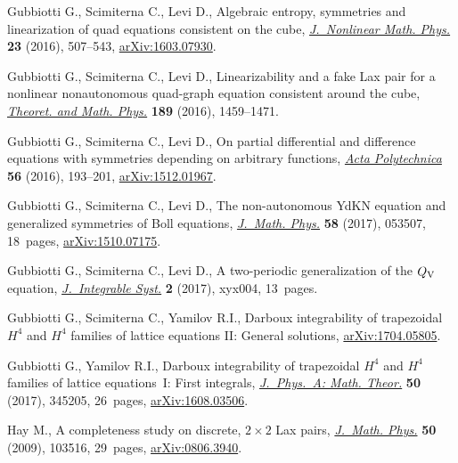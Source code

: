 \documentclass[pdftex]{sigma}
\numberwithin{equation}{section}
\begin{document}
\begin{thebibliography}{99}
Gubbiotti G., Scimiterna C., Levi D., Algebraic entropy, symmetries and
 linearization of quad equations consistent on the cube, \href{https://doi.org/10.1080/14029251.2016.1237200}{\textit{J.~Nonlinear
 Math. Phys.}} \textbf{23} (2016), 507--543, \href{https://arxiv.org/abs/1603.07930}{arXiv:1603.07930}.

Gubbiotti G., Scimiterna C., Levi D., Linearizability and a fake Lax pair for a
 nonlinear nonautonomous quad-graph equation consistent around the cube,
 \href{https://doi.org/10.1134/S0040577916100068}{\textit{Theoret. and Math. Phys.}} \textbf{189} (2016), 1459--1471.

Gubbiotti G., Scimiterna C., Levi D., On partial dif\/ferential and dif\/ference
 equations with symmetries depending on arbitrary functions, \href{https://doi.org/10.14311/AP.2016.56.0193}{\textit{Acta
 Polytechnica}} \textbf{56} (2016), 193--201, \href{https://arxiv.org/abs/1512.01967}{arXiv:1512.01967}.

Gubbiotti G., Scimiterna C., Levi D., The non-autonomous {Y}d{KN} equation and
 generalized symmetries of {B}oll equations, \href{https://doi.org/10.1063/1.4982747}{\textit{J.~Math. Phys.}}
 \textbf{58} (2017), 053507, 18~pages, \href{https://arxiv.org/abs/1510.07175}{arXiv:1510.07175}.

Gubbiotti G., Scimiterna C., Levi D., A two-periodic generalization of the
 {$Q_{\rm V}$} equation, \href{https://doi.org/10.1093/integr/xyx004}{\textit{J.~Integrable Syst.}} \textbf{2} (2017),
 xyx004, 13~pages.

Gubbiotti G., Scimiterna C., Yamilov R.I., Darboux integrability of trapezoidal {$H^4$} and
 {$H^4$} families of lattice equations {II}: {G}eneral solutions,
 \href{https://arxiv.org/abs/1704.05805}{arXiv:1704.05805}.

Gubbiotti G., Yamilov R.I., Darboux integrability of trapezoidal {$H^4$} and
 {$H^4$} families of lattice equations~{I}: {F}irst integrals,
 \href{https://doi.org/10.1088/1751-8121/aa7fd9}{\textit{J.~Phys.~A: Math. Theor.}} \textbf{50} (2017), 345205, 26~pages,
 \href{https://arxiv.org/abs/1608.03506}{arXiv:1608.03506}.

Hay M., A completeness study on discrete, {$2\times2$} {L}ax pairs,
 \href{https://doi.org/10.1063/1.3177197}{\textit{J.~Math. Phys.}} \textbf{50} (2009), 103516, 29~pages,
 \href{https://arxiv.org/abs/0806.3940}{arXiv:0806.3940}.


\end{thebibliography}
\end{document}
